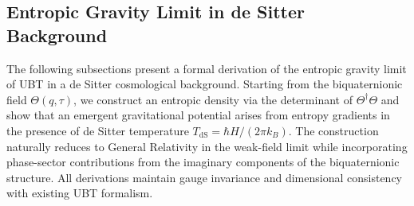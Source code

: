 



\subsection{Entropic Gravity Limit in de Sitter Background}
\label{subsec:entropic_ds_limit}

The following subsections present a formal derivation of the entropic gravity limit of UBT in a de Sitter cosmological background. Starting from the biquaternionic field $\Theta(q,\tau)$, we construct an entropic density via the determinant of $\Theta^\dagger \Theta$ and show that an emergent gravitational potential arises from entropy gradients in the presence of de Sitter temperature $T_{\text{dS}} = \hbar H/(2\pi k_B)$. The construction naturally reduces to General Relativity in the weak-field limit while incorporating phase-sector contributions from the imaginary components of the biquaternionic structure. All derivations maintain gauge invariance and dimensional consistency with existing UBT formalism.






